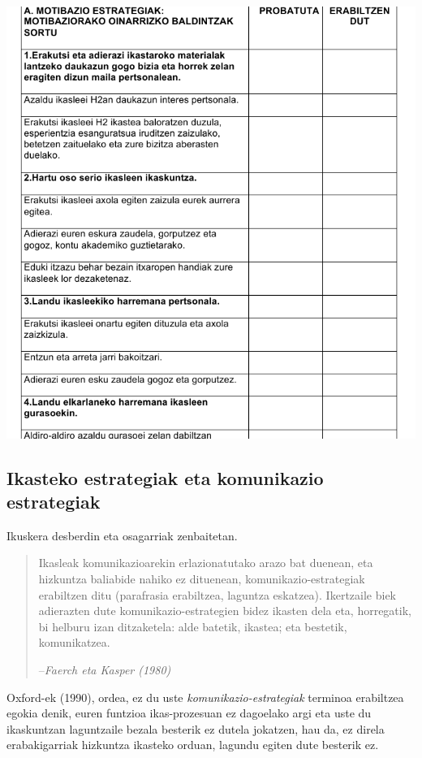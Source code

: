 \documentclass[
]{book}
\begin{document}
\includegraphics{assets/06-02.png}

\hypertarget{ikasteko-estrategiak-eta-komunikazio-estrategiak}{%
\subsection{Ikasteko estrategiak eta komunikazio estrategiak}\label{ikasteko-estrategiak-eta-komunikazio-estrategiak}}

Ikuskera desberdin eta osagarriak zenbaitetan.

\begin{quote}
Ikasleak komunikazioarekin erlazionatutako arazo bat duenean, eta hizkuntza baliabide nahiko ez dituenean, komunikazio-estrategiak erabiltzen ditu (parafrasia erabiltzea, laguntza eskatzea). Ikertzaile biek adierazten dute komunikazio-estrategien bidez ikasten dela eta, horregatik, bi helburu izan ditzaketela: alde batetik, ikastea; eta bestetik, komunikatzea.

--\emph{Faerch eta Kasper (1980)}
\end{quote}

Oxford-ek (1990), ordea, ez du uste \emph{komunikazio-estrategiak} terminoa erabiltzea egokia denik, euren funtzioa ikas-prozesuan ez dagoelako argi eta uste du ikaskuntzan laguntzaile bezala besterik ez dutela jokatzen, hau da, ez direla erabakigarriak hizkuntza ikasteko orduan, lagundu egiten dute besterik ez.
\end{document}
